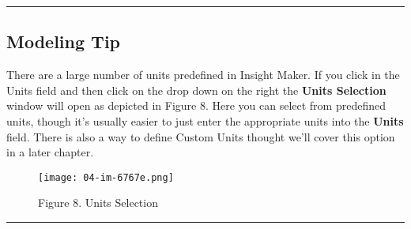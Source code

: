 \documentclass[]{memoir}
\let\Oldincludegraphics\includegraphics
\renewcommand{\includegraphics}[1]{\Oldincludegraphics[max size={\textwidth}{\textheight}]{#1}}
\renewcommand{\u}[1]{\textbf{#1}}
\renewcommand{\a}[1]{\textbf{#1}}
\begin{document}
\begin{center}\rule{3in}{0.4pt}\end{center}

\subsection{Modeling Tip}

There are a large number of units predefined in Insight Maker. If you
click in the Units field and then click on the drop down on the right
the \u{Units Selection} window will open as depicted in Figure 8. Here
you can select from predefined units, though it's usually easier to just
enter the appropriate units into the \a{Units} field. There is also a
way to define Custom Units thought we'll cover this option in a later
chapter.

\begin{figure}[htbp]
\centering
\texttt{[image: 04-im-6767e.png]}
\caption{Figure 8. Units Selection}
\end{figure}

\begin{center}\rule{3in}{0.4pt}\end{center}

\FloatBarrier 
\end{document}
